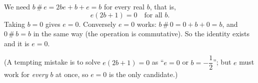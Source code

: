 We need $b\,\#\,e=2be+b+e=b$ for every real $b$, that is,
\[
e(2b+1)=0\quad\text{for all }b .
\]
Taking $b=0$ gives $e=0$. Conversely $e=0$ works: $b\,\#\,0=0+b+0=b$, and $0\,\#\,b=b$ in the same way (the operation is commutative). So the identity exists and it is $\boxed{e=0}$.

(A tempting mistake is to solve $e(2b+1)=0$ as ``$e=0$ or $b=-\dfrac{1}{2}$''; but $e$ must work for \emph{every} $b$ at once, so $e=0$ is the only candidate.)
